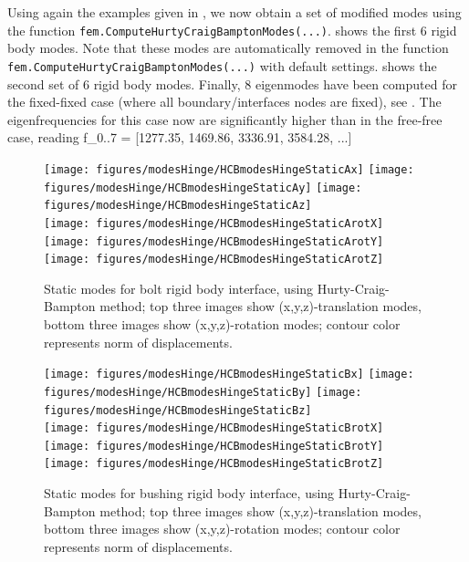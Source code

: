 Using again the examples given in , we now obtain a set of modified modes using the function \texttt{fem.ComputeHurtyCraigBamptonModes(...)}.
 shows the first 6 rigid body modes. Note that these modes are automatically removed in the function \texttt{fem.ComputeHurtyCraigBamptonModes(...)} with default settings.
 shows the second set of 6 rigid body modes. 
Finally, 8 eigenmodes have been computed for the fixed-fixed case (where all boundary/interfaces nodes are fixed),
see . 
The eigenfrequencies for this case now are significantly higher than in the free-free case, reading
\be
  f_{0..7} = [1277.35, 1469.86, 3336.91, 3584.28, ...]
\ee
\begin{figure}[tbph]
  \begin{center}
  \texttt{[image: figures/modesHinge/HCBmodesHingeStaticAx]}
  \texttt{[image: figures/modesHinge/HCBmodesHingeStaticAy]}
  \texttt{[image: figures/modesHinge/HCBmodesHingeStaticAz]}\\
  \texttt{[image: figures/modesHinge/HCBmodesHingeStaticArotX]}
  \texttt{[image: figures/modesHinge/HCBmodesHingeStaticArotY]}
  \texttt{[image: figures/modesHinge/HCBmodesHingeStaticArotZ]}
  \end{center}
  \caption{Static modes for bolt rigid body interface, using Hurty-Craig-Bampton method; top three images show (x,y,z)-translation modes, bottom three images show (x,y,z)-rotation modes; contour color represents norm of displacements.}
	\label{fig_hingePartStaticModesA}
\end{figure}

\begin{figure}[tbph]
  \begin{center}
  \texttt{[image: figures/modesHinge/HCBmodesHingeStaticBx]}
  \texttt{[image: figures/modesHinge/HCBmodesHingeStaticBy]}
  \texttt{[image: figures/modesHinge/HCBmodesHingeStaticBz]}\\
  \texttt{[image: figures/modesHinge/HCBmodesHingeStaticBrotX]}
  \texttt{[image: figures/modesHinge/HCBmodesHingeStaticBrotY]}
  \texttt{[image: figures/modesHinge/HCBmodesHingeStaticBrotZ]}
  \end{center}
  \caption{Static modes for bushing rigid body interface, using Hurty-Craig-Bampton method; top three images show (x,y,z)-translation modes, bottom three images show (x,y,z)-rotation modes; contour color represents norm of displacements.}
	\label{fig_hingePartStaticModesB}
\end{figure}

